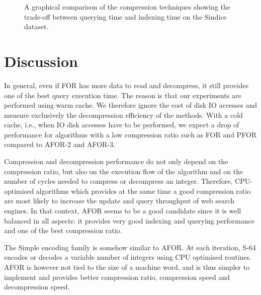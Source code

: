 \begin{figure}
  \centering
\caption{A graphical comparison of the compression techniques showing the
trade-off between querying time and indexing time on the Sindice dataset.}
\label{fig:trade-off-query-update}
\end{figure}

\section{Discussion}

In general, even if FOR has more data to read and decompress, it still
provides one of the best query execution time. The reason is that our
experiments are performed using warm cache. We therefore ignore the cost of
disk IO accesses and measure exclusively the decompression efficiency of the
methods. With a cold cache, i.e., when IO disk accesses have to be performed,
we expect a drop of performance for algorithms with a low compression ratio
such as FOR and PFOR compared to AFOR-2 and AFOR-3.

Compression and decompression performance do not only depend on the
compression ratio, but also on the execution flow of the algorithm and on the
number of cycles needed to compress or decompress an integer. Therefore,
CPU-optimised algorithms which provides at the same time a good compression
ratio are most likely to increase the update and query throughput of web
search engines. In that context, AFOR seems to be a good candidate since it is
well balanced in all aspects: it provides very good indexing and querying
performance and one of the best compression ratio.

The Simple encoding family is somehow similar to AFOR. At each iteration, S-64
encodes or decodes a variable number of integers using CPU optimised routines.
AFOR is however not tied to the size of a machine word, and is thus simpler to
implement and provides better compression ratio, compression speed and
decompression speed.
